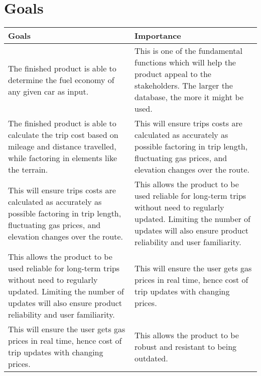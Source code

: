 \documentclass{article}
\begin{document}
\section{Goals}
    \begin{tabular}{| p{0.5\linewidth} | p{0.5\linewidth} |}
		\hline
\textbf{Goals} & \textbf{Importance}\\ \hline
The finished product is able to determine the fuel economy of any given car as input. & This is one of the fundamental functions which will help the product appeal to the stakeholders. The larger the database, the more it might be used.\\ \hline
The finished product is able to calculate the trip cost based on mileage and distance travelled, while factoring in elements like the terrain. & This will ensure trips costs are calculated as accurately as possible factoring in trip length, fluctuating gas prices, and elevation changes over the route.\\ \hline 
This will ensure trips costs are calculated as accurately as possible factoring in trip length, fluctuating gas prices, and elevation changes over the route. & This allows the product to be used reliable for long-term trips without need to regularly updated. Limiting the number of updates will also ensure product reliability and user familiarity.\\ \hline 
This allows the product to be used reliable for long-term trips without need to regularly updated. Limiting the number of updates will also ensure product reliability and user familiarity. & This will ensure the user gets gas prices in real time, hence cost of trip updates with changing prices.\\ \hline
This will ensure the user gets gas prices in real time, hence cost of trip updates with changing prices. & This allows the product to be robust and resistant to being outdated. \\ \hline  
    \end{tabular}
\end{document}
